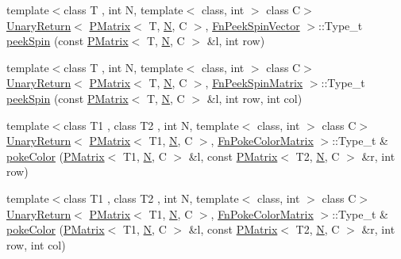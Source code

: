 \begin{DoxyCompactItemize}
\item 
{\footnotesize template$<$class T , int N, template$<$ class, int $>$ class C$>$ }\\\mbox{\hyperlink{structENSEM_1_1UnaryReturn}{Unary\+Return}}$<$ \mbox{\hyperlink{classENSEM_1_1PMatrix}{P\+Matrix}}$<$ T, \mbox{\hyperlink{operator__name__util_8cc_a7722c8ecbb62d99aee7ce68b1752f337}{N}}, C $>$, \mbox{\hyperlink{structENSEM_1_1FnPeekSpinVector}{Fn\+Peek\+Spin\+Vector}} $>$\+::Type\+\_\+t \mbox{\hyperlink{group__primmatrix_gaf26619f85146d483d1c177abf5c2f476}{peek\+Spin}} (const \mbox{\hyperlink{classENSEM_1_1PMatrix}{P\+Matrix}}$<$ T, \mbox{\hyperlink{operator__name__util_8cc_a7722c8ecbb62d99aee7ce68b1752f337}{N}}, C $>$ \&l, int row)
\item 
{\footnotesize template$<$class T , int N, template$<$ class, int $>$ class C$>$ }\\\mbox{\hyperlink{structENSEM_1_1UnaryReturn}{Unary\+Return}}$<$ \mbox{\hyperlink{classENSEM_1_1PMatrix}{P\+Matrix}}$<$ T, \mbox{\hyperlink{operator__name__util_8cc_a7722c8ecbb62d99aee7ce68b1752f337}{N}}, C $>$, \mbox{\hyperlink{structENSEM_1_1FnPeekSpinMatrix}{Fn\+Peek\+Spin\+Matrix}} $>$\+::Type\+\_\+t \mbox{\hyperlink{group__primmatrix_ga2efe19b2ef4dc4cbacc12117645bf8b8}{peek\+Spin}} (const \mbox{\hyperlink{classENSEM_1_1PMatrix}{P\+Matrix}}$<$ T, \mbox{\hyperlink{operator__name__util_8cc_a7722c8ecbb62d99aee7ce68b1752f337}{N}}, C $>$ \&l, int row, int col)
\item 
{\footnotesize template$<$class T1 , class T2 , int N, template$<$ class, int $>$ class C$>$ }\\\mbox{\hyperlink{structENSEM_1_1UnaryReturn}{Unary\+Return}}$<$ \mbox{\hyperlink{classENSEM_1_1PMatrix}{P\+Matrix}}$<$ T1, \mbox{\hyperlink{operator__name__util_8cc_a7722c8ecbb62d99aee7ce68b1752f337}{N}}, C $>$, \mbox{\hyperlink{structENSEM_1_1FnPokeColorMatrix}{Fn\+Poke\+Color\+Matrix}} $>$\+::Type\+\_\+t \& \mbox{\hyperlink{group__primmatrix_ga0cfeefefe2bd8b4e365ac10d8853664a}{poke\+Color}} (\mbox{\hyperlink{classENSEM_1_1PMatrix}{P\+Matrix}}$<$ T1, \mbox{\hyperlink{operator__name__util_8cc_a7722c8ecbb62d99aee7ce68b1752f337}{N}}, C $>$ \&l, const \mbox{\hyperlink{classENSEM_1_1PMatrix}{P\+Matrix}}$<$ T2, \mbox{\hyperlink{operator__name__util_8cc_a7722c8ecbb62d99aee7ce68b1752f337}{N}}, C $>$ \&r, int row)
\item 
{\footnotesize template$<$class T1 , class T2 , int N, template$<$ class, int $>$ class C$>$ }\\\mbox{\hyperlink{structENSEM_1_1UnaryReturn}{Unary\+Return}}$<$ \mbox{\hyperlink{classENSEM_1_1PMatrix}{P\+Matrix}}$<$ T1, \mbox{\hyperlink{operator__name__util_8cc_a7722c8ecbb62d99aee7ce68b1752f337}{N}}, C $>$, \mbox{\hyperlink{structENSEM_1_1FnPokeColorMatrix}{Fn\+Poke\+Color\+Matrix}} $>$\+::Type\+\_\+t \& \mbox{\hyperlink{group__primmatrix_gab840db69dc60bcb095f46b69353d09f3}{poke\+Color}} (\mbox{\hyperlink{classENSEM_1_1PMatrix}{P\+Matrix}}$<$ T1, \mbox{\hyperlink{operator__name__util_8cc_a7722c8ecbb62d99aee7ce68b1752f337}{N}}, C $>$ \&l, const \mbox{\hyperlink{classENSEM_1_1PMatrix}{P\+Matrix}}$<$ T2, \mbox{\hyperlink{operator__name__util_8cc_a7722c8ecbb62d99aee7ce68b1752f337}{N}}, C $>$ \&r, int row, int col)

\end{DoxyCompactItemize}
